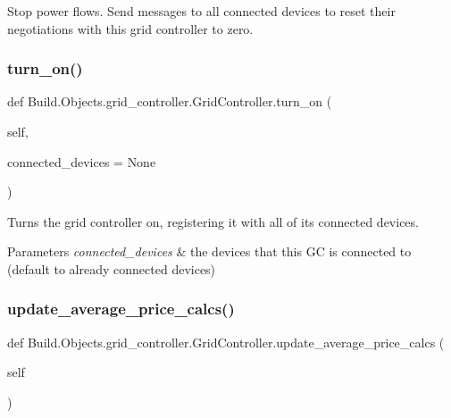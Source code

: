 Stop power flows. Send messages to all connected devices to reset their negotiations with this grid controller to zero. \mbox{\label{class_build_1_1_objects_1_1grid__controller_1_1_grid_controller_a024c6220ba4e03dca547d99e1f3a39be}} 
\subsubsection{\texorpdfstring{turn\+\_\+on()}{turn\_on()}}
{\footnotesize\ttfamily def Build.\+Objects.\+grid\+\_\+controller.\+Grid\+Controller.\+turn\+\_\+on (\begin{DoxyParamCaption}\item[{}]{self,  }\item[{}]{connected\+\_\+devices = {\ttfamily None} }\end{DoxyParamCaption})}



Turns the grid controller on, registering it with all of its connected devices. 


\begin{DoxyParams}{Parameters}
{\em connected\+\_\+devices} & the devices that this GC is connected to (default to already connected devices) \\
\hline
\end{DoxyParams}
\mbox{\label{class_build_1_1_objects_1_1grid__controller_1_1_grid_controller_a51734204cdfcff80c9ba18eacec07dde}} 
\subsubsection{\texorpdfstring{update\+\_\+average\+\_\+price\+\_\+calcs()}{update\_average\_price\_calcs()}}
{\footnotesize\ttfamily def Build.\+Objects.\+grid\+\_\+controller.\+Grid\+Controller.\+update\+\_\+average\+\_\+price\+\_\+calcs (\begin{DoxyParamCaption}\item[{}]{self }\end{DoxyParamCaption})}



